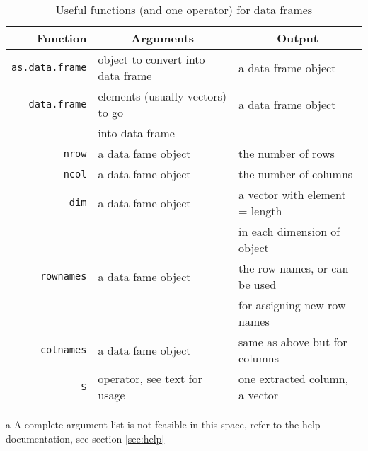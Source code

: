 \documentclass[12pt]{article}
\begin{document}
\begin{table}[!htb]
	\begin{threeparttable}
	\caption{Useful functions (and one operator) for data frames}	\label{data.frame}

	\begin{tabular}{r l l}
		\hline
		Function 	&	\multicolumn{1}{c}{Arguments\tnote{a}}	&	\multicolumn{1}{c}{Output}		\\
		\hline
		\verb+as.data.frame+	&	object to convert into data frame	&	a data frame object	\\
		\verb+data.frame+		&	elements (usually vectors) to go	&	a data frame object	\\				
							&	into data frame					&					\\
		\verb+nrow+	&	a data fame object				&	the number of rows				\\
		\verb+ncol+	&	a data fame object				&	the number of columns			\\
		\verb+dim+	&	a data fame object				&	a vector with element = length		\\
					&								&	in each dimension of object		\\
		\verb+rownames+&	a data fame object				&	the row names, or can be used		\\
					&								&	for assigning new row names		\\
		\verb+colnames+&	a data fame object				&	same as above but for columns	\\
		\verb+$+		&	operator, see text for usage		&	one extracted column, a vector		\\
		\hline
	\end{tabular}
	\begin{tablenotes}
		\item[a] A complete argument list is not feasible in this space, refer to the help documentation, see section \ref{sec:help}
	\end{tablenotes}
	\end{threeparttable}
\end{table}
\end{document}

